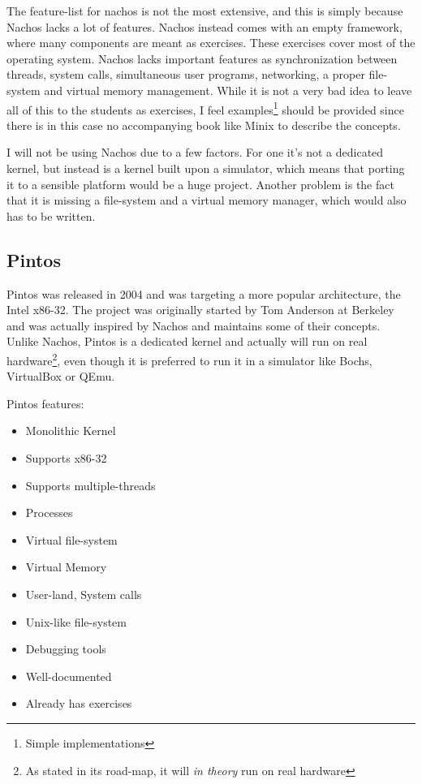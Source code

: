 The feature-list for nachos is not the most extensive, and this is simply because Nachos lacks a lot of features. Nachos instead comes with an empty framework, where many components are  meant as exercises. These exercises cover most of the operating system. Nachos lacks important features as synchronization between threads, system calls, simultaneous user programs, networking, a proper file-system and virtual memory management. While it is not a very bad idea to leave all of this to the students as exercises, I feel examples\footnote{Simple implementations} should be provided since there is in this case no accompanying book like Minix to describe the concepts.

I will not be using Nachos due to a few factors. For one it's not a dedicated kernel, but instead is a kernel built upon a simulator, which means that porting it to a sensible platform would be a huge project. Another problem is the fact that it is missing a file-system and a virtual memory manager, which would also has to be written. 

\subsection{Pintos}

Pintos was released in 2004 and was targeting a more popular architecture, the Intel x86-32. The project was originally started by Tom Anderson at Berkeley and was actually inspired by Nachos and maintains some of their concepts. Unlike Nachos, Pintos is a dedicated kernel and actually will run on real hardware\footnote{As stated in its road-map, it will \emph{in theory} run on real hardware}, even though it is preferred to run it in a simulator like Bochs, VirtualBox or QEmu.

Pintos features\cite{PintosRef}:

\begin{itemize}
  \item Monolithic Kernel
  \item Supports x86-32
  \item Supports multiple-threads
  \item Processes
  \item Virtual file-system
  \item Virtual Memory
  \item User-land, System calls
  \item Unix-like file-system
  \item Debugging tools
  \item Well-documented
  \item Already has exercises
\end{itemize}

